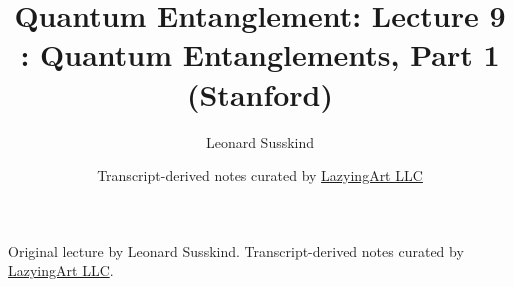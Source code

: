 \documentclass[11pt,oneside]{book}
\begin{document}
\frontmatter
\title{Quantum Entanglement: Lecture 9 : Quantum Entanglements, Part 1 (Stanford)}
\author{Leonard Susskind}
\date{Transcript-derived notes curated by \href{https://lazying.art}{LazyingArt LLC}}
\maketitle
\begin{center}
\small Original lecture by Leonard Susskind. Transcript-derived notes curated by \href{https://lazying.art}{LazyingArt LLC}.
\end{center}
\clearpage
\mainmatter

\end{document}
